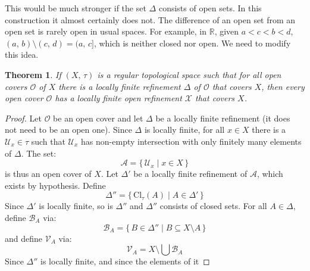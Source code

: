\documentclass{article}
\theoremstyle{plain}
\newtheorem{theorem}{Theorem}[section]
\theoremstyle{normal}
\begin{document}
        This would be much stronger if the set $\Delta$ consists of open sets.
        In this construction it almost certainly does not. The difference of an
        open set from an open set is rarely open in usual spaces. For example,
        in $\mathbb{R}$, given $a<c<b<d$, $(a,\,b)\setminus(c,\,d)=(a,\,c]$,
        which is neither closed nor open. We need to modify this idea.
        \begin{theorem}
            If $(X,\,\tau)$ is a regular topological space such that for all
            open covers $\mathcal{O}$ of $X$ there is a locally finite
            refinement $\Delta$ of $\mathcal{O}$ that covers $X$, then every
            open cover $\mathcal{O}$ has a locally finite open refinement
            $\mathcal{X}$ that covers $X$.
        \end{theorem}
        \begin{proof}
            Let $\mathcal{O}$ be an open cover and let $\Delta$ be a locally
            finite refinement (it does not need to be an open one). Since
            $\Delta$ is locally finite, for all $x\in{X}$ there is a
            $\mathcal{U}_{x}\in\tau$ such that $\mathcal{U}_{x}$ has non-empty
            intersection with only finitely many elements of $\Delta$. The set:
            \begin{equation}
                \mathcal{A}=
                \{\,\mathcal{U}_{x}\;|\;x\in{X}\,\}
            \end{equation}
            is thus an open cover of $X$. Let $\Delta'$ be a locally finite
            refinement of $\mathcal{A}$, which exists by hypothesis. Define
            \begin{equation}
                \Delta''
                =\{\,\textrm{Cl}_{\tau}(A)\;|\;A\in\Delta'\,\}
            \end{equation}
            Since $\Delta'$ is locally finite, so is $\Delta''$ and $\Delta''$
            consists of closed sets. For all $A\in\Delta$,
            define $\mathcal{B}_{A}$ via:
            \begin{equation}
                \mathcal{B}_{A}=
                \{\,B\in\Delta''\;|\;B\subseteq{X}\setminus{A}\,\}
            \end{equation}
            and define $\mathcal{V}_{A}$ via:
            \begin{equation}
                \mathcal{V}_{A}=X\setminus\bigcup\mathcal{B}_{A}
            \end{equation}
            Since $\Delta''$ is locally finite, and since the elements of it

\end{proof}
\end{document}
